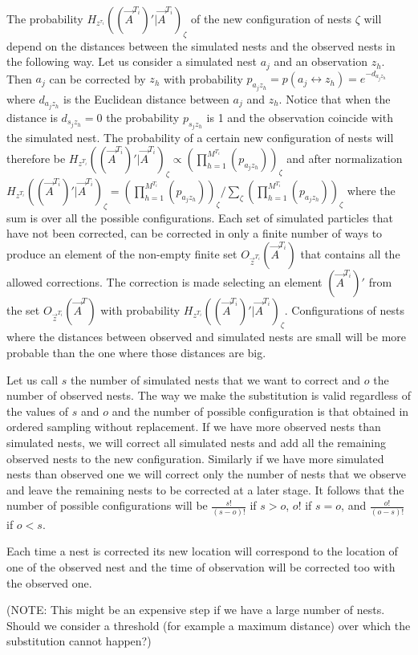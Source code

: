 {The probability $H_{z^{\tau_i}}((\vec{A}^{T_i})' | \vec{A}^{T_i})_{\zeta}$ of the new configuration of nests $\zeta$ will depend on the distances between the simulated nests and the observed nests in the following way. Let us consider a simulated nest $a_j$ and an observation $z_h$. Then $a_j$ can be corrected by $z_h$ with probability $p_{a_j z_h} = p(a_j \leftrightarrow z_h) = e^{-d_{a_j z_h}}$ where $d_{a_j z_h}$ is the Euclidean distance between $a_j$ and $z_h$. Notice that when the distance is $d_{s_j z_h} = 0$ the probability $p_{s_j z_h}$ is 1 and the observation coincide with the simulated nest. The probability of a certain new configuration of nests will therefore be $H_{z^{T_i}}((\vec{A}^{T_i})' | \vec{A}^{T_i})_{\zeta} \propto (\prod_{h = 1}^{M^{T_i}} (p_{a_j z_h}))_{\zeta}$ and after normalization $H_{z^{T_i}}((\vec{A}^{T_i})' | \vec{A}^{T_i})_{\zeta} = (\prod_{h = 1}^{M^{T_i}} (p_{a_j z_h}))_{\zeta} / \sum_{\zeta} (\prod_{h = 1}^{M^{T_i}} (p_{a_j z_h}))_{\zeta} $ where the sum is over all the possible configurations. Each set of simulated particles that have not been corrected, can be corrected in only a finite number of ways to produce an element of the non-empty finite set $O_{\vec{z}^{T_i}} (\vec{A}^{T_i})$ that contains all the allowed corrections. The correction is made selecting an element $(\vec{A}^{T_i})'$ from the set $O_{\vec{z}^{T_i}} (\vec{A}^T)$ with probability $H_{z^{T_i}}((\vec{A}^{T_i})' | \vec{A}^{T_i})_{\zeta}$. Configurations of nests where the distances between observed and simulated nests are small will be more probable than the one where those distances are big.

Let us call $s$ the number of simulated nests that we want to correct and $o$ the number of observed nests. The way we make the substitution is valid regardless of the values of $s$ and $o$ and the number of possible configuration is that obtained in ordered sampling without replacement. If we have more observed nests than simulated nests, we will correct all simulated nests and add all the remaining observed nests to the new configuration. Similarly if we have more simulated nests than observed one we will correct only the number of nests that we observe and leave the remaining nests to be corrected at a later stage.
It follows that the number of possible configurations will be $\frac{s!}{(s-o)!}$ if $s > o$, $o!$ if $s = o$, and $\frac{o!}{(o-s)!}$ if $o < s$.

Each time a nest is corrected its new location will correspond to the location of one of the observed nest and the time of observation will be corrected too with the observed one.

(NOTE: This might be an expensive step if we have a large number of nests. Should we consider a threshold (for example a maximum distance) over which the substitution cannot happen?) 
}

